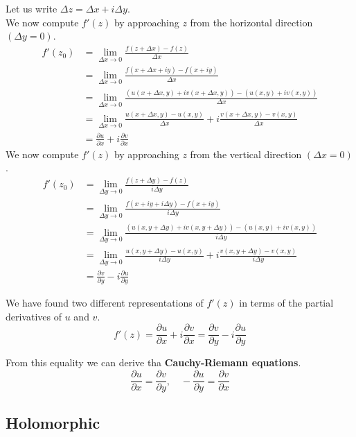 \documentclass{article}
\begin{document}
Let us write \(\Delta z = \Delta x + i\Delta y\). \\
We now compute \(f'(z)\) by approaching \(z\) from the
horizontal direction \((\Delta y=0)\).
\begin{align*}
    f'(z_0) &= \lim_{\Delta x \to 0} \frac{f(z + \Delta x) - f(z)}{\Delta x} \\
    &= \lim_{\Delta x \to 0}
        \frac{f(x + \Delta x + iy) - f(x + iy)}{\Delta x} \\
    &= \lim_{\Delta x \to 0}
        \frac{(u(x + \Delta x, y) + iv(x + \Delta x, y)) - (u(x,y)+iv(x,y))}{\Delta x} \\
    &= \lim_{\Delta x \to 0}
        \frac{u(x + \Delta x, y) - u(x,y)}{\Delta x} + i\frac{v(x + \Delta x, y) - v(x,y)}{\Delta x} \\
    &= \frac{\partial u}{\partial x} + i \frac{\partial v}{\partial x}
\end{align*}
We now compute \(f'(z)\) by approaching \(z\) from the
vertical direction \((\Delta x=0)\).
\begin{align*}
    f'(z_0) &= \lim_{\Delta y \to 0} \frac{f(z + \Delta y) - f(z)}{i\Delta y} \\
    &= \lim_{\Delta y \to 0}
        \frac{f(x + iy + i\Delta y) - f(x + iy)}{i\Delta y} \\
    &= \lim_{\Delta y \to 0}
        \frac{(u(x, y + \Delta y) + iv(x, y + \Delta y)) - (u(x,y)+iv(x,y))}{i\Delta y} \\
    &= \lim_{\Delta y \to 0}
        \frac{u(x, y + \Delta y) - u(x,y)}{i\Delta y} + i\frac{v(x, y + \Delta y) - v(x,y)}{i\Delta y} \\
    &= \frac{\partial v}{\partial y} -i\frac{\partial u}{\partial y}
\end{align*}

We have found two different representations of \(f'(z)\) in terms
of the partial derivatives of \(u\) and \(v\).
\[
    f'(z)=\frac{\partial u}{\partial x} +i\frac{\partial v}{\partial x}
    = \frac{\partial v}{\partial y} -i \frac{\partial u}{\partial y}
\]

From this equality we can derive tha \textbf{Cauchy-Riemann equations}.
\[
    \frac{\partial u}{\partial x}=\frac{\partial v}{\partial y},
    \quad
    -\frac{\partial u}{\partial y}=\frac{\partial v}{\partial x}
\]

\pagebreak

\subsection{Holomorphic}
\end{document}
